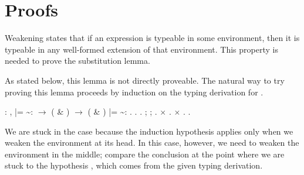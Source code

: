 \documentclass[12pt]{report}
\begin{document}
\section{Proofs}



 Weakening states that if an expression is typeable in some
    environment, then it is typeable in any well-formed extension of
    that environment.  This property is needed to prove the
    substitution lemma.


    As stated below, this lemma is not directly proveable.  The natural
    way to try proving this lemma proceeds by induction on the typing
    derivation for .
\begin{coqdoccode}
\coqdocemptyline
\coqdocnoindent
{}  : \coqdockw{\ensuremath{\forall}}    ,\coqdoceol
\coqdocindent{1.50em}
 |=  \~{}:  \ensuremath{\rightarrow} \coqdoceol
\coqdocindent{1.50em}
 ( \& ) \ensuremath{\rightarrow}\coqdoceol
\coqdocindent{1.50em}
( \& ) |=  \~{}: .\coqdoceol
\coqdocnoindent
{}.\coqdoceol
\coqdocindent{1.00em}
 .  ;  ; .\coqdoceol
\coqdocindent{1.00em}
\ensuremath{\times} .\coqdoceol
\coqdocindent{1.00em}
\ensuremath{\times}   . \coqdocnoindent
{}.\coqdoceol
\coqdocemptyline
\end{coqdoccode}
We are stuck in the  case because the induction
    hypothesis  applies only when we weaken the environment at its
    head.  In this case, however, we need to weaken the environment in
    the middle; compare the conclusion at the point where we are stuck
    to the hypothesis , which comes from the given typing derivation.
\end{document}
